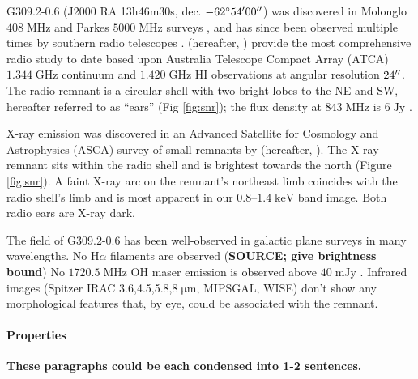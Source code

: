 \documentclass[preprint2,tighten,trackchanges]{aastex6}
\newcommand*{\mt}{\mathrm}
\newcommand*{\unit}[1]{\;\mt{#1}}  %
\begin{document}
G309.2-0.6 (J2000 RA 13h46m30s, dec. $-62\mbox{$^\circ$} 54\mbox{$^\prime$} 00\mbox{$^{\prime\prime}$}$) was
discovered in Molonglo $408 \unit{MHz}$ and Parkes $5000 \unit{MHz}$ surveys
\citep{day1969, clark1973, green1974, clark1975}, and has since been observed multiple
times by southern radio telescopes \citep{caswell1981, kesteven1987,
whiteoak1996, gaensler1998}.
\citet{gaensler1998} (hereafter, ) provide the most
comprehensive radio study to date based upon Australia Telescope Compact Array
(ATCA) $1.344 \unit{GHz}$ continuum and $1.420 \unit{GHz}$ HI observations at
angular resolution $24\mbox{$^{\prime\prime}$}$.
The radio remnant is a circular shell with two bright lobes to the NE and SW,
hereafter referred to as ``ears'' (Fig \ref{fig:snr});
the flux density at $843 \unit{MHz}$ is $6 \unit{Jy}$ \citep{whiteoak1996}.

X-ray emission was discovered in an Advanced Satellite for Cosmology and
Astrophysics (ASCA) survey of small remnants by \citet{rakowski2001}
(hereafter, ).
The X-ray remnant sits within the radio shell and is brightest towards the
north (Figure \ref{fig:snr}).
A faint X-ray arc on the remnant's northeast limb coincides with the radio
shell's limb and is most apparent in our $0.8$--$1.4 \unit{keV}$ band image.
Both radio ears are X-ray dark.

The field of G309.2-0.6 has been well-observed in galactic plane surveys in
many wavelengths.
No H$\alpha$ filaments are observed (\textbf{SOURCE; give brightness bound}) %
No $1720.5 \unit{MHz}$ OH maser emission is observed above $40 \unit{mJy}$
\citep{green1997}.
Infrared images (Spitzer IRAC 3.6,4.5,5.8,$8 \unit{{\mu}m}$, MIPSGAL, WISE)
don't show any morphological features that, by eye, could be associated with
the remnant.

\paragraph{Properties}

\textbf{These paragraphs could be each condensed into 1-2 sentences.}
\end{document}
